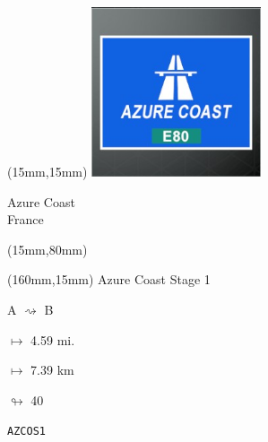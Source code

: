 \begin{textblock*}{50mm}(15mm,15mm)%
\includegraphics[width=50mm]{LG/2015-05-20_00073.png}
\par Azure Coast\\ France
\end{textblock*}
\begin{textblock*}{185mm}(15mm,80mm)%
\end{textblock*}
\begin{textblock*}{40mm}(160mm,15mm)%
Azure Coast Stage 1
\par A $\rightsquigarrow$ B
\Large
\par$\mapsto$ 4.59 mi.
\par$\mapsto$ 7.39 km
\par$\looparrowright$ 40
\par\hfill\tiny\tt AZCOS1\\
\end{textblock*}
\null\newpage

